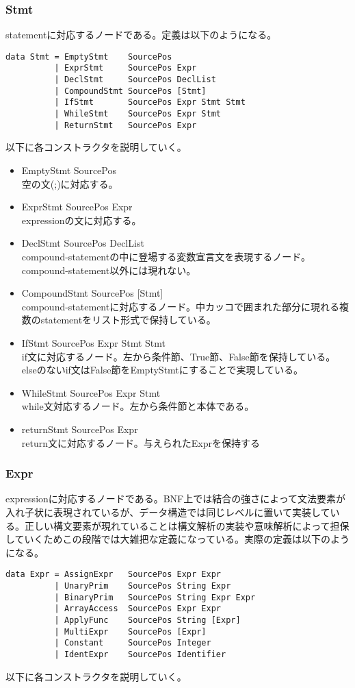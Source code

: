 \documentclass{jsarticle}
\begin{document}
\subsubsection{Stmt}
statementに対応するノードである。定義は以下のようになる。
\begin{verbatim}
data Stmt = EmptyStmt    SourcePos
          | ExprStmt     SourcePos Expr
          | DeclStmt     SourcePos DeclList
          | CompoundStmt SourcePos [Stmt]
          | IfStmt       SourcePos Expr Stmt Stmt
          | WhileStmt    SourcePos Expr Stmt
          | ReturnStmt   SourcePos Expr
\end{verbatim}
以下に各コンストラクタを説明していく。
\begin{itemize}
\item EmptyStmt SourcePos \mbox{} \\
空の文(;)に対応する。
\item ExprStmt SourcePos Expr \mbox{} \\
expressionの文に対応する。
\item DeclStmt SourcePos DeclList \mbox{} \\
compound-statementの中に登場する変数宣言文を表現するノード。compound-statement以外には現れない。
\item CompoundStmt SourcePos [Stmt] \mbox{} \\
compound-statementに対応するノード。中カッコで囲まれた部分に現れる複数のstatementをリスト形式で保持している。
\item IfStmt SourcePos Expr Stmt Stmt \mbox{} \\
if文に対応するノード。左から条件節、True節、False節を保持している。elseのないif文はFalse節をEmptyStmtにすることで実現している。
\item WhileStmt SourcePos Expr Stmt \mbox{} \\
while文対応するノード。左から条件節と本体である。
\item returnStmt SourcePos Expr \mbox{} \\
return文に対応するノード。与えられたExprを保持する
\end{itemize}

\subsubsection{Expr}
expressionに対応するノードである。BNF上では結合の強さによって文法要素が入れ子状に表現されているが、データ構造では同じレベルに置いて実装している。正しい構文要素が現れていることは構文解析の実装や意味解析によって担保していくためこの段階では大雑把な定義になっている。実際の定義は以下のようになる。
\begin{verbatim}
data Expr = AssignExpr   SourcePos Expr Expr
          | UnaryPrim    SourcePos String Expr
          | BinaryPrim   SourcePos String Expr Expr
          | ArrayAccess  SourcePos Expr Expr
          | ApplyFunc    SourcePos String [Expr]
          | MultiExpr    SourcePos [Expr]
          | Constant     SourcePos Integer
          | IdentExpr    SourcePos Identifier
\end{verbatim}
以下に各コンストラクタを説明していく。
\end{document}
